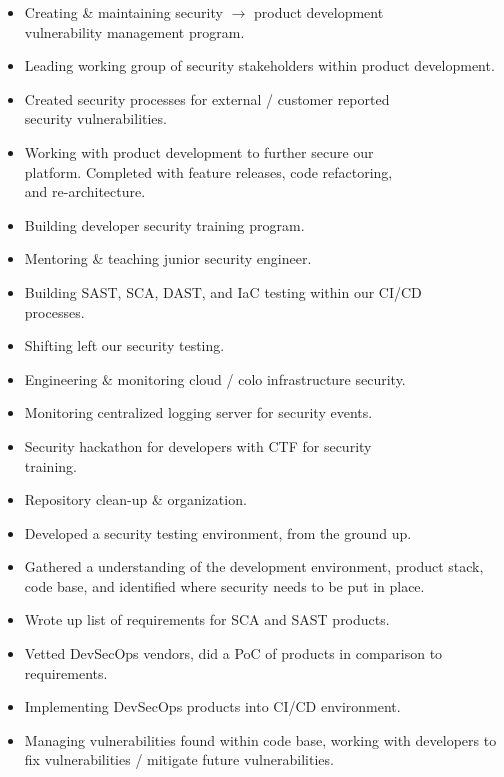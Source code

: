 \documentclass[10pt,a4paper,ragged2e]{rohrbach}
\begin{document}
\begin{paracol}{2}

\begin{itemize}
  \item Creating \& maintaining security $\rightarrow$ product development\\ vulnerability management program.
  \item Leading working group of security stakeholders within product development.
  \item Created security processes for external / customer reported\\ security vulnerabilities.
  \item Working with product development to further secure our\\ platform. Completed with feature releases, code refactoring,\\ and re-architecture.
  \item Building developer security training program.
  \item Mentoring \& teaching junior security engineer.
  \item Building SAST, SCA, DAST, and IaC testing within our CI/CD\\ processes.
  \item Shifting left our security testing.
  \item Engineering \& monitoring cloud / colo infrastructure security.
  \item Monitoring centralized logging server for security events.
  \item Security hackathon for developers with CTF for security\\ training.
  \item Repository clean-up \& organization.
\end{itemize}

\divider

\begin{itemize}
  \item Developed a security testing environment, from the ground up.
  \item Gathered a understanding of the development environment, product stack, code base, and identified where security needs to be put in place.
  \item Wrote up list of requirements for SCA and SAST products.
  \item Vetted DevSecOps vendors, did a PoC of products in comparison to requirements.
  \item Implementing DevSecOps products into CI/CD environment.
  \item Managing vulnerabilities found within code base, working with developers to fix vulnerabilities / mitigate future vulnerabilities.
\end{itemize}


\end{paracol}
\end{document}
